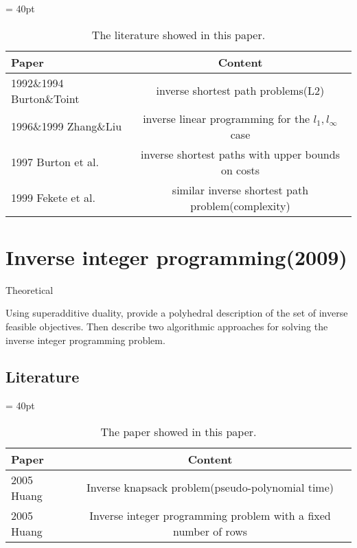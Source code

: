 \documentclass[UTF8]{article}
\begin{document}
\begin{table}[ht]
 
 \tabcolsep = 40pt
 
 \small\renewcommand{}
 
 \caption{The literature showed in this paper.\label{tab:6}}
 
 {\begin{tabular}{lc}
   \hline
   Paper                    & Content                                                  \\
   \hline
   1992\&1994 Burton\&Toint & inverse shortest path problems(L2)                       \\
   \hline
   1996\&1999 Zhang\&Liu    & inverse linear programming for the  $l_1, l_\infty$ case \\
   \hline
   1997 Burton et al.       & inverse shortest paths with upper bounds on costs        \\
   \hline
   1999 Fekete et al.       & similar inverse shortest path problem(complexity)        \\
   \hline
  \end{tabular}}
 {}
\end{table}



\section{Inverse integer programming(2009)}

Theoretical

Using superadditive duality, provide a polyhedral description of the set of inverse feasible objectives. Then describe two algorithmic approaches for solving the inverse integer programming problem.


\subsection{Literature}


\begin{table}[ht]
 
 \tabcolsep = 40pt
 
 \small\renewcommand{}
 
 \caption{The paper showed in this paper.\label{tab:7}}
 
 {\begin{tabular}{lc}
   \hline
   Paper      & Content                                                         \\
   \hline
   2005 Huang & Inverse knapsack problem(pseudo-polynomial time)                \\
   \hline
   2005 Huang & Inverse integer programming problem with a fixed number of rows \\
   \hline
  \end{tabular}}
 {}
\end{table}
\end{document}
